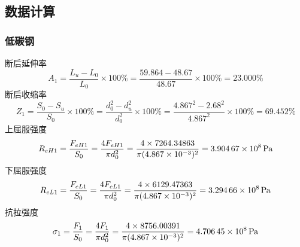 \subsection{数据计算}
\subsubsection{低碳钢}
\noindent 断后延伸率
\begin{equation}
    A_1=\frac{L_u-L_0}{L_0}\times 100\%=\frac{59.864 - 48.67}{48.67}\times 100\%=23.000\%
\end{equation}
断后收缩率
\begin{equation}
    Z_1=\frac{S_0-S_u}{S_0}\times 100\%=\frac{d_0^2-d_u^2}{d_0^2}\times 100\%=\frac{4.867^2-2.68^2}{4.867^2}\times 100\% = 69.452\%
\end{equation}
上屈服强度
\begin{equation}
    R_{eH1}=\frac{F_{eH1}}{S_{0}}=\frac{4 F_{eH1}}{\pi d_{0}^2}=\frac{4\times 7264.34863}{\pi(4.867\times 10^{-3})^{2}}=\SI{3.90467d8}{\Pa}
\end{equation}
下屈服强度
\begin{equation}
    R_{eL1}=\frac{F_{eL1}}{S_{0}}=\frac{4 F_{eL1}}{\pi d_{0}^2}=\frac{4\times 6129.47363}{\pi(4.867\times 10^{-3})^{2}}=\SI{3.29466d8}{\Pa}
\end{equation}
抗拉强度
\begin{equation}
    \sigma_1=\frac{F_1}{S_{0}}=\frac{4 F_1}{\pi d_{0}^2}=\frac{4\times 8756.00391}{\pi(4.867\times 10^{-3})^{2}}=\SI{4.70645d8}{\Pa}
\end{equation}
